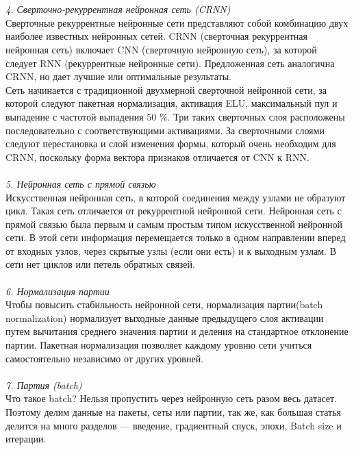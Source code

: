 \documentclass{article}
\begin{document}
    \\ \\
    \textit{4. Сверточно-рекуррентная нейронная сеть (CRNN)}
    \\
    Сверточные рекуррентные нейронные сети представляют собой комбинацию двух наиболее известных нейронных сетей. CRNN (сверточная рекуррентная нейронная сеть) включает CNN (сверточную нейронную сеть), за которой следует RNN (рекуррентные нейронные сети). Предложенная сеть аналогична CRNN, но дает лучшие или оптимальные результаты.
    \\
    Сеть начинается с традиционной двухмерной сверточной нейронной сети, за которой следуют пакетная нормализация, активация ELU, максимальный пул и выпадение с частотой выпадения 50 ${\%}$. Три таких сверточных слоя расположены последовательно с соответствующими активациями. За сверточными слоями следуют перестановка и слой изменения формы, который очень необходим для CRNN, поскольку форма вектора признаков отличается от CNN к RNN.
    \\ \\
    \textit{5. Нейронная сеть с прямой связью}
    \\
    Искусственная нейронная сеть, в которой соединения между узлами не образуют цикл. Такая сеть отличается от рекуррентной нейронной сети. Нейронная сеть с прямой связью была первым и самым простым типом искусственной нейронной сети. В этой сети информация перемещается только в одном направлении вперед от входных узлов, через скрытые узлы (если они есть) и к выходным узлам. В сети нет циклов или петель обратных связей.
    \\ \\
    \textit{6. Нормализация партии}
    \\
    Чтобы повысить стабильность нейронной сети, нормализация партии(batch normalization) нормализует выходные данные предыдущего слоя активации путем вычитания среднего значения партии и деления на стандартное отклонение партии. Пакетная нормализация позволяет каждому уровню сети учиться самостоятельно независимо от других уровней.
    \\ \\
    \textit{7. Партия (batch)}
    \\
    Что такое batch? Нельзя пропустить через нейронную сеть разом весь датасет. Поэтому делим данные на пакеты, сеты или партии, так же, как большая статья делится на много разделов — введение, градиентный спуск, эпохи, Batch size и итерации.
    \\ \\
\end{document}
